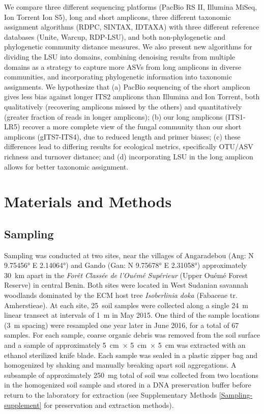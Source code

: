\documentclass[
  12pt,
]{article}
\begin{document}
We compare three different sequencing platforms (PacBio RS II, Illumina MiSeq, Ion Torrent Ion S5), long and short amplicons, three different taxonomic assignment algorithms (RDPC, SINTAX, IDTAXA)
with three different reference databases (Unite, Warcup, RDP-LSU),
and both non-phylogenetic and phylogenetic community distance measures.
We also present new algorithms for dividing the LSU into domains, combining denoising results from multiple domains as a strategy to capture more ASVs from long amplicons in diverse communities, and incorporating phylogenetic information into taxonomic assignments.
We hypothesize that (a) PacBio sequencing of the short amplicon gives less bias against longer ITS2 amplicons than Illumina and Ion Torrent, both qualitatively (recovering amplicons missed by the others) and quantitatively (greater fraction of reads in longer amplicons);
(b) our long amplicons (ITS1-LR5) recover a more complete view of the fungal community than our short amplicons (gITS7-ITS4), due to reduced length and primer biases;
(c) these differences lead to differing results for ecological metrics, specifically OTU/ASV richness and turnover distance;
and (d) incorporating LSU in the long amplicon allows for better taxonomic assignment.

\hypertarget{materials-and-methods}{%
\section{Materials and Methods}\label{materials-and-methods}}

\hypertarget{sampling}{%
\subsection{Sampling}\label{sampling}}

Sampling was conducted at two sites, near the villages of Angaradebou (Ang: N 9.75456° E 2.14064°) and Gando (Gan: N 9.75678° E 2.31058°) approximately 30~km apart in the \emph{Forêt Classée de l'Ouémé Supérieur} (Upper Ouémé Forest Reserve) in central Benin.
Both sites were located in West Sudanian savannah woodlands \autocite{olson2001,yorou2014} dominated by the ECM host tree \emph{Isoberlinia doka} (Fabaceae tr. Amherstieae).
At each site, 25~soil samples were collected along a single 24~m linear transect at intervals of 1~m in May 2015.
One third of the sample locations (3~m spacing) were resampled one year later in June 2016, for a total of 67 samples.
For each sample, coarse organic debris was removed from the soil surface and a sample of approximately 5~cm~× 5~cm~× 5~cm was extracted with an ethanol sterilized knife blade.
Each sample was sealed in a plastic zipper bag and homogenized by shaking and manually breaking apart soil aggregations.
A subsample of approximately 250~mg total of soil was collected from two locations in the homogenized soil sample and stored in a DNA preservation buffer before return to the laboratory for extraction (see Supplementary Methods \ref{Sampling-supplement} for preservation and extraction methods).
\end{document}
